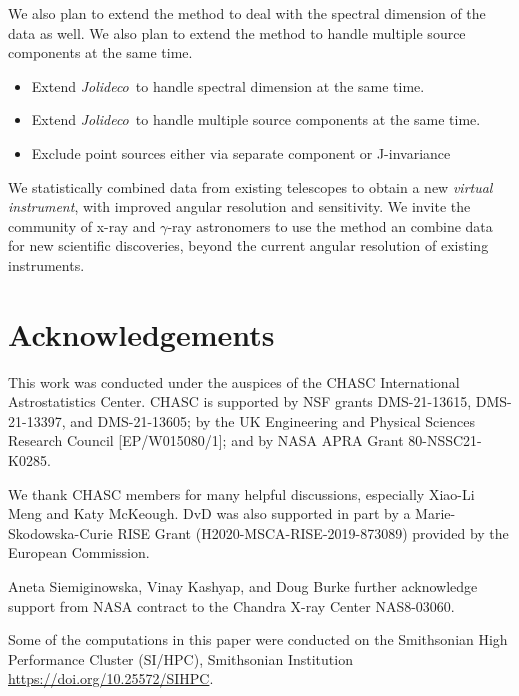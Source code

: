 \documentclass[twocolumn]{aastex631}
\newcommand{\jolideco}{\textit{Jolideco}~}
\newcommand{\gammaray}{$\gamma$-ray\xspace}
\begin{document}
    We also plan to extend the method to deal with the spectral dimension of the data as well. We also plan to extend the method to handle multiple source components at the same time.
    
    \begin{itemize}
        \item Extend \jolideco to handle spectral dimension at the same time.
        \item Extend \jolideco to handle multiple source components at the same time.
        \item Exclude point sources either via separate component or J-invariance
    \end{itemize}

  

    We statistically combined data from existing telescopes to obtain a new \textit{virtual instrument}, with improved angular resolution and sensitivity. We invite the community of x-ray and \gammaray astronomers to use the method an combine data for new scientific discoveries, beyond the current angular resolution of existing instruments.

    \section*{Acknowledgements}
    This work was conducted under the auspices of the CHASC International Astrostatistics Center.
    CHASC is supported by NSF grants DMS-21-13615, DMS-21-13397, and DMS-21-13605; by the UK Engineering
    and Physical Sciences Research Council [EP/W015080/1]; and by NASA APRA Grant 80-NSSC21-K0285.
    
    We thank CHASC members for many helpful discussions, especially Xiao-Li Meng and Katy McKeough.
    DvD was also supported in part by a Marie-Skodowska-Curie RISE Grant (H2020-MSCA-RISE-2019-873089)
    provided by the European Commission.
    
    Aneta Siemiginowska, Vinay Kashyap, and Doug Burke further acknowledge support from NASA
    contract to the Chandra X-ray Center NAS8-03060.

    Some of the computations in this paper were conducted on the Smithsonian High Performance
    Cluster (SI/HPC), Smithsonian Institution \url{https://doi.org/10.25572/SIHPC}.

    \newpage
    
\end{document}
